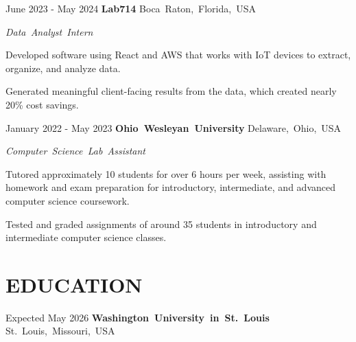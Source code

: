 \documentclass[10pt, letterpaper]{article}
\begin{document}
\vspace{\entrySpacing}\begin{twocolentry}{June 2023 - May 2024}
    \mbox{\textbf{Lab714}}
    \kern {}
    \AND
    \kern {}
    \mbox{Boca Raton, Florida, USA}
\end{twocolentry}

\vspace{\highlightSpacing}
\mbox{\textit{Data Analyst Intern}}
\begin{onecolentry}
    \begin{highlights}
        \item Developed software using React and AWS that works with IoT devices to extract, organize, and analyze data.
        \item Generated meaningful client-facing results from the data, which created nearly 20\% cost savings.
    \end{highlights}
\end{onecolentry}

\vspace{\entrySpacing}\begin{twocolentry}{January 2022 - May 2023}
    \mbox{\textbf{Ohio Wesleyan University}}
    \kern {}
    \AND
    \kern {}
    \mbox{Delaware, Ohio, USA}
\end{twocolentry}

\vspace{\highlightSpacing}
\mbox{\textit{Computer Science Lab Assistant}}
\begin{onecolentry}
    \begin{highlights}
        \item Tutored approximately 10 students for over 6 hours per week, assisting with homework and exam preparation for introductory, intermediate, and advanced computer science coursework.
        \item Tested and graded assignments of around 35 students in introductory and intermediate computer science classes.
    \end{highlights}
\end{onecolentry}

\section{EDUCATION}

\begin{twocolentry}{Expected May 2026}
    \mbox{\textbf{Washington University in St. Louis}}
    \kern {}
    \AND
    \kern {}
    \mbox{St. Louis, Missouri, USA}
\end{twocolentry}
\end{document}
